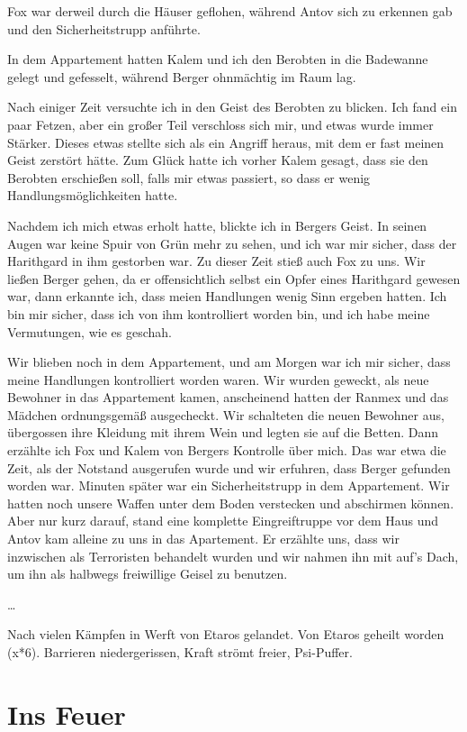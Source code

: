 \documentclass[11pt]{scrartcl}
\begin{document}
Fox war derweil durch die Häuser geflohen, während Antov sich zu
erkennen gab und den Sicherheitstrupp anführte.

In dem Appartement hatten Kalem und ich den Berobten in die Badewanne
gelegt und gefesselt, während Berger ohnmächtig im Raum lag.

Nach einiger Zeit versuchte ich in den Geist des Berobten zu blicken.
Ich fand ein paar Fetzen, aber ein großer Teil verschloss sich mir, und
etwas wurde immer Stärker. Dieses etwas stellte sich als ein Angriff
heraus, mit dem er fast meinen Geist zerstört hätte. Zum Glück hatte ich
vorher Kalem gesagt, dass sie den Berobten erschießen soll, falls mir
etwas passiert, so dass er wenig Handlungsmöglichkeiten hatte.

Nachdem ich mich etwas erholt hatte, blickte ich in Bergers Geist. In
seinen Augen war keine Spuir von Grün mehr zu sehen, und ich war mir
sicher, dass der Harithgard in ihm gestorben war. Zu dieser Zeit stieß
auch Fox zu uns. Wir ließen Berger gehen, da er offensichtlich selbst
ein Opfer eines Harithgard gewesen war, dann erkannte ich, dass meien
Handlungen wenig Sinn ergeben hatten. Ich bin mir sicher, dass ich von
ihm kontrolliert worden bin, und ich habe meine Vermutungen, wie es
geschah.

Wir blieben noch in dem Appartement, und am Morgen war ich mir sicher,
dass meine Handlungen kontrolliert worden waren. Wir wurden geweckt, als
neue Bewohner in das Appartement kamen, anscheinend hatten der Ranmex
und das Mädchen ordnungsgemäß ausgecheckt. Wir schalteten die neuen
Bewohner aus, übergossen ihre Kleidung mit ihrem Wein und legten sie auf
die Betten. Dann erzählte ich Fox und Kalem von Bergers Kontrolle über
mich. Das war etwa die Zeit, als der Notstand ausgerufen wurde und wir
erfuhren, dass Berger gefunden worden war. Minuten später war ein
Sicherheitstrupp in dem Appartement. Wir hatten noch unsere Waffen unter
dem Boden verstecken und abschirmen können. Aber nur kurz darauf, stand
eine komplette Eingreiftruppe vor dem Haus und Antov kam alleine zu uns
in das Apartement. Er erzählte uns, dass wir inzwischen als Terroristen
behandelt wurden und wir nahmen ihn mit auf's Dach, um ihn als halbwegs
freiwillige Geisel zu benutzen.

\ldots{}

Nach vielen Kämpfen in Werft von Etaros gelandet. Von Etaros geheilt
worden (x*6). Barrieren niedergerissen, Kraft strömt freier, Psi-Puffer.

\section{Ins Feuer}
\end{document}
